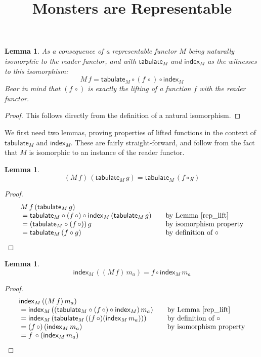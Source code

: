 \documentclass{article}
\title{Monsters are Representable}
\newtheorem{lemma}[definition]{Lemma}
\begin{document}


\newcommand{\tabulatef}{\mathsf{tabulate}}
\newcommand{\indexf}{\mathsf{index}}

\maketitle

\begin{lemma}\label{rep_lift}
As a consequence of a representable functor $M$ being naturally isomorphic to the reader functor, and with $\tabulatef_M$ and $\indexf_M$ as the witnesses to this isomorphism:
$$
M\, f = \tabulatef_M \circ (f\, \circ) \circ \indexf_M
$$
Bear in mind that $(f\, \circ)$ is exactly the lifting of a function $f$ with the reader functor.
\end{lemma}
\begin{proof}
This follows directly from the definition of a natural isomorphism.
\end{proof}

We first need two lemmas, proving properties of lifted functions in the context of $\tabulatef_M$ and $\indexf_M$. These are fairly straight-forward, and follow from the fact that $M$ is isomorphic to an instance of the reader functor.

\begin{lemma}\label{rep_tabulate}
$$
(M\, f) \,(\tabulatef_M\, g) = \tabulatef_M\, (f \circ g)
$$
\end{lemma}
\begin{proof}
$$
\begin{array}{l@{\qquad}l}
M\, f \, (\tabulatef_M\, g) \\
{}= \tabulatef_M \circ (f\, \circ) \circ \indexf_M\, (\tabulatef_M\, g) & \mbox{by Lemma \ref{rep_lift}} \\
{}= (\tabulatef_M \circ (f\, \circ))\, g & \mbox{by isomorphism property} \\
{}= \tabulatef_M\, (f \circ g) & \mbox{by definition of }\circ 
\end{array}
$$
\end{proof}


\begin{lemma}\label{rep_index}
$$
\indexf_M\, ((M\,f)\, m_a) = f \circ \indexf_M\, m_a
$$
\end{lemma}
\begin{proof}
$$
\begin{array}{l@{\qquad}l}
\indexf_M\, ((M\,f)\, m_a)\\
{}= \indexf_M\, ((\tabulatef_M \circ (f\, \circ) \circ \indexf_M)\, m_a) 
  & \mbox{by Lemma \ref{rep_lift}}\\
{}= \indexf_M\, (\tabulatef_M\, ((f\, \circ) (\indexf_M\, m_a))) 
  & \mbox{by definition of }\circ \\
{}= (f\, \circ)\, (\indexf_M\, m_a) 
  & \mbox{by isomorphism property} \\
{}= f\, \circ (\indexf_M\, m_a) \\
\end{array}
$$
\end{proof}
\end{document}

